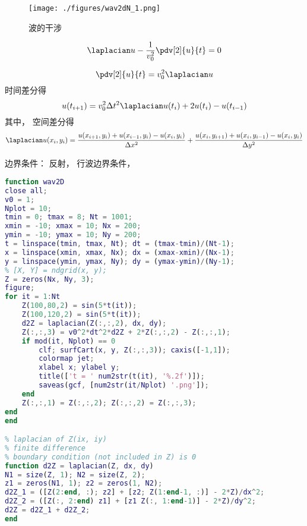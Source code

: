 
\begin{issues}
\issueDraft
\end{issues}


\begin{figure}[ht]
\centering
\texttt{[image: ./figures/wav2dN\_1.png]}
\caption{波的干涉} \label{wav2dN_fig1}
\end{figure}

\begin{equation}
\laplacian u - \frac{1}{v_0^2}\pdv[2]{u}{t} = 0
\end{equation}

\begin{equation}
\pdv[2]{u}{t} = v_0^2\laplacian u
\end{equation}
时间差分得
\begin{equation}
u(t_{i+1}) = v_0^2\Delta t^2\laplacian u(t_i) + 2u(t_{i}) - u(t_{i-1})
\end{equation}
其中， 空间差分得
\begin{equation}
\laplacian u(x_i,y_i) = \frac{u(x_{i+1}, y_i) + u(x_{i-1}, y_i) - u(x_{i}, y_i)}{\Delta x^2}
+ \frac{u(x_i, y_{i+1}) + u(x_i, y_{i-1}) - u(x_i, y_{i})}{\Delta y^2}
\end{equation}

边界条件： 反射， 行波边界条件， 

\begin{lstlisting}[language=matlab, caption=wav2D.m]
% 2D wave equation, by simple difference
function wav2D
close all;
v0 = 1;
Nplot = 10;
tmin = 0; tmax = 8; Nt = 1001;
xmin = -10; xmax = 10; Nx = 200;
ymin = -10; ymax = 10; Ny = 200;
t = linspace(tmin, tmax, Nt); dt = (tmax-tmin)/(Nt-1);
x = linspace(xmin, xmax, Nx); dx = (xmax-xmin)/(Nx-1);
y = linspace(ymin, ymax, Ny); dy = (ymax-ymin)/(Ny-1);
% [X, Y] = ndgrid(x, y);
Z = zeros(Nx, Ny, 3);
figure;
for it = 1:Nt
    Z(100,80,2) = sin(5*t(it));
    Z(100,120,2) = sin(5*t(it));
    d2Z = laplacian(Z(:,:,2), dx, dy);
    Z(:,:,3) = v0^2*dt^2*d2Z + 2*Z(:,:,2) - Z(:,:,1);
    if mod(it, Nplot) == 0
        clf; surfCart(x, y, Z(:,:,3)); caxis([-1,1]);
        colormap jet;
        xlabel x; ylabel y;
        title(['t = ' num2str(t(it), '%.2f')]);
        saveas(gcf, [num2str(it/Nplot) '.png']);
    end
    Z(:,:,1) = Z(:,:,2); Z(:,:,2) = Z(:,:,3);
end
end

% laplacian of Z(ix, iy)
% finite difference
% boundary condition (not included in Z) is 0
function d2Z = laplacian(Z, dx, dy)
N1 = size(Z, 1); N2 = size(Z, 2);
z1 = zeros(N1, 1); z2 = zeros(1, N2);
d2Z_1 = ([Z(2:end, :); z2] + [z2; Z(1:end-1, :)] - 2*Z)/dx^2;
d2Z_2 = ([Z(:, 2:end) z1] + [z1 Z(:, 1:end-1)] - 2*Z)/dy^2;
d2Z = d2Z_1 + d2Z_2;
end
\end{lstlisting}
